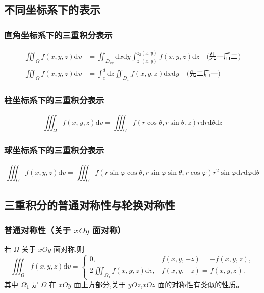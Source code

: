 \documentclass[UTF8]{ctexart}
\theoremstyle{remark}
\begin{document}
			\subsection{不同坐标系下的表示}
			\subsubsection{直角坐标系下的三重积分表示}
			
			\begin{align}
				\iiint_{\Omega} f(x, y, z) \mathrm{d}v &= \iint_{D_{xy}} \mathrm{d}x \mathrm{d}y \int_{z_1(x,y)}^{z_2(x,y)} f(x, y, z) \mathrm{d}z \quad \text{(先一后二)} \\
				\iiint_{\Omega} f(x, y, z) \mathrm{d}v &= \int_{c}^{d} \mathrm{d}z \iint_{D_z} f(x, y, z) \mathrm{d}x \mathrm{d}y \quad \text{(先二后一)}
			\end{align}
			
			
			\subsubsection{柱坐标系下的三重积分表示}
			\[ 
			\iiint_{\Omega} f(x, y, z) \mathrm{d}v = \iiint_{\Omega} f(r \cos\theta, r \sin\theta, z) r \mathrm{d}r \mathrm{d}\theta \mathrm{d}z
			\]
			
			\subsubsection{球坐标系下的三重积分表示}
			\[ 
			\iiint_{\Omega} f(x, y, z) \mathrm{d}v = \iiint_{\Omega} f(r \sin\varphi \cos\theta, r \sin\varphi \sin\theta, r \cos\varphi) r^2 \sin\varphi \mathrm{d}r \mathrm{d}\varphi \mathrm{d}\theta
			\]
			
			\subsection{三重积分的普通对称性与轮换对称性}
			\subsubsection{普通对称性（关于 \( xOy \) 面对称）}
			若 \( \Omega \) 关于 \( xOy \) 面对称,则
			\[ 
			\iiint_{\Omega} f(x, y, z) \mathrm{d}v = 
			\begin{cases}
				0, & f(x, y, -z) = -f(x, y, z), \\
				2\iiint_{\Omega_1} f(x, y, z) \mathrm{d}v, & f(x, y, -z) = f(x, y, z).
			\end{cases}
			\]
			其中 \( \Omega_1 \) 是 \( \Omega \) 在 \( xOy \) 面上方部分,关于 \( yOz \),\( xOz \) 面的对称性有类似的性质。
			
\end{document}
